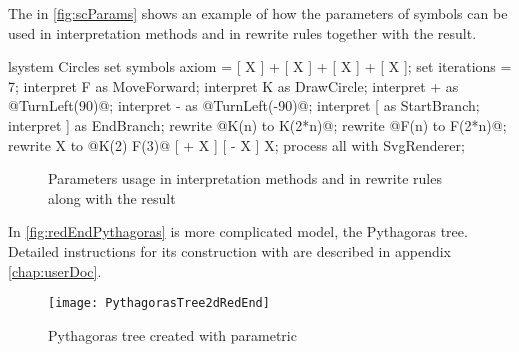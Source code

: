 The \lsystem in \autoref{fig:scParams} shows an example of how the parameters of symbols can be used in interpretation methods and in rewrite rules together with the result.

\newsavebox{\lstBox}
\begin{lrbox}{\lstBox}
\begin{Lsystem50}
lsystem Circles {
	set symbols axiom =	[ X ] +
		[ X ] + [ X ] + [ X ];
	set iterations = 7;
	interpret F as MoveForward;
	interpret K as DrawCircle;
	interpret + as @TurnLeft(90)@;
	interpret - as @TurnLeft(-90)@;
	interpret [ as StartBranch;
	interpret ] as EndBranch;
	rewrite @K(n) to K(2*n)@;
	rewrite @F(n) to F(2*n)@;
	rewrite X to @K(2) F(3)@
		[ + X ] [ - X ] X;
}
process all with SvgRenderer;
\end{Lsystem50}
\end{lrbox}

\begin{figure}[h!]
	\subfloat{
		\usebox{\lstBox}
	} \hfill
	\caption{Parameters usage in \lsystem interpretation methods and in rewrite rules along with the result}
	\label{fig:scParams}
\end{figure}

In \autoref{fig:redEndPythagoras} is more complicated model, the Pythagoras tree.
Detailed instructions for its construction with \lsystems are described in appendix \ref{chap:userDoc}.

\begin{figure}[H]
	\centering
	\texttt{[image: PythagorasTree2dRedEnd]}
	\caption{Pythagoras tree created with parametric \lsystem}
	\label{fig:redEndPythagoras}
\end{figure}
































